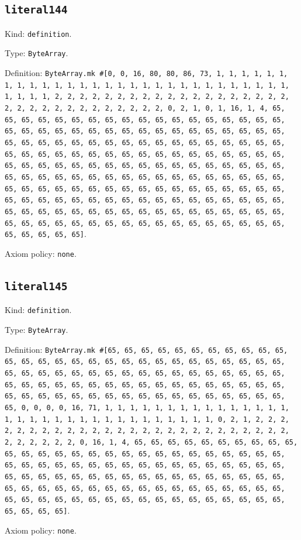 \documentclass[11pt]{article}
\begin{document}
\subsection*{\texttt{literal144}}
\noindent Kind: \texttt{definition}.\par
\noindent Type: \texttt{ByteArray}.\par
\noindent Definition: \texttt{ByteArray.mk \#[0, 0, 16, 80, 80, 86, 73, 1, 1, 1, 1, 1, 1, 1, 1, 1, 1, 1, 1, 1, 1, 1, 1, 1, 1, 1, 1, 1, 1, 1, 1, 1, 1, 1, 1, 1, 1, 1, 1, 1, 2, 2, 2, 2, 2, 2, 2, 2, 2, 2, 2, 2, 2, 2, 2, 2, 2, 2, 2, 2, 2, 2, 2, 2, 2, 2, 2, 2, 2, 2, 2, 2, 0, 2, 1, 0, 1, 16, 1, 4, 65, 65, 65, 65, 65, 65, 65, 65, 65, 65, 65, 65, 65, 65, 65, 65, 65, 65, 65, 65, 65, 65, 65, 65, 65, 65, 65, 65, 65, 65, 65, 65, 65, 65, 65, 65, 65, 65, 65, 65, 65, 65, 65, 65, 65, 65, 65, 65, 65, 65, 65, 65, 65, 65, 65, 65, 65, 65, 65, 65, 65, 65, 65, 65, 65, 65, 65, 65, 65, 65, 65, 65, 65, 65, 65, 65, 65, 65, 65, 65, 65, 65, 65, 65, 65, 65, 65, 65, 65, 65, 65, 65, 65, 65, 65, 65, 65, 65, 65, 65, 65, 65, 65, 65, 65, 65, 65, 65, 65, 65, 65, 65, 65, 65, 65, 65, 65, 65, 65, 65, 65, 65, 65, 65, 65, 65, 65, 65, 65, 65, 65, 65, 65, 65, 65, 65, 65, 65, 65, 65, 65, 65, 65, 65, 65, 65, 65, 65, 65, 65, 65, 65, 65, 65, 65, 65, 65, 65, 65, 65, 65, 65, 65, 65, 65, 65, 65, 65, 65, 65, 65, 65, 65, 65, 65, 65]}.\par
\noindent Axiom policy: \texttt{none}.\par
\subsection*{\texttt{literal145}}
\noindent Kind: \texttt{definition}.\par
\noindent Type: \texttt{ByteArray}.\par
\noindent Definition: \texttt{ByteArray.mk \#[65, 65, 65, 65, 65, 65, 65, 65, 65, 65, 65, 65, 65, 65, 65, 65, 65, 65, 65, 65, 65, 65, 65, 65, 65, 65, 65, 65, 65, 65, 65, 65, 65, 65, 65, 65, 65, 65, 65, 65, 65, 65, 65, 65, 65, 65, 65, 65, 65, 65, 65, 65, 65, 65, 65, 65, 65, 65, 65, 65, 65, 65, 65, 65, 65, 65, 65, 65, 65, 65, 65, 65, 65, 65, 65, 65, 65, 65, 65, 65, 0, 0, 0, 0, 16, 71, 1, 1, 1, 1, 1, 1, 1, 1, 1, 1, 1, 1, 1, 1, 1, 1, 1, 1, 1, 1, 1, 1, 1, 1, 1, 1, 1, 1, 1, 1, 1, 1, 0, 2, 1, 2, 2, 2, 2, 2, 2, 2, 2, 2, 2, 2, 2, 2, 2, 2, 2, 2, 2, 2, 2, 2, 2, 2, 2, 2, 2, 2, 2, 2, 2, 2, 2, 0, 16, 1, 4, 65, 65, 65, 65, 65, 65, 65, 65, 65, 65, 65, 65, 65, 65, 65, 65, 65, 65, 65, 65, 65, 65, 65, 65, 65, 65, 65, 65, 65, 65, 65, 65, 65, 65, 65, 65, 65, 65, 65, 65, 65, 65, 65, 65, 65, 65, 65, 65, 65, 65, 65, 65, 65, 65, 65, 65, 65, 65, 65, 65, 65, 65, 65, 65, 65, 65, 65, 65, 65, 65, 65, 65, 65, 65, 65, 65, 65, 65, 65, 65, 65, 65, 65, 65, 65, 65, 65, 65, 65, 65, 65, 65, 65, 65, 65, 65, 65, 65, 65]}.\par
\noindent Axiom policy: \texttt{none}.\par
\end{document}
